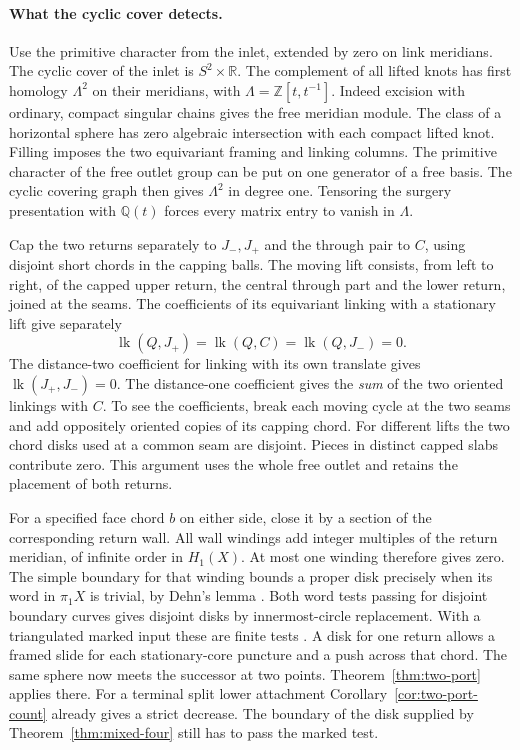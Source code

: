 \documentclass[11pt,letterpaper]{article}
\numberwithin{equation}{section}
\theoremstyle{remark}
\begin{document}
\paragraph{What the cyclic cover detects.}
Use the primitive character from the inlet, extended by zero on
link meridians. The cyclic cover of the inlet is \(S^2\times\mathbb R\).
The complement of all lifted knots has first homology
\(\Lambda^2\) on their meridians, with \(\Lambda=\mathbb Z[t,t^{-1}]\).
Indeed excision with ordinary, compact singular chains gives the
free meridian module. The class of a horizontal sphere has zero
algebraic intersection with each compact lifted knot. Filling imposes
the two equivariant framing and linking columns. The primitive
character of the free outlet group can be put on one generator of
a free basis. The cyclic covering graph then gives \(\Lambda^2\) in
degree one. Tensoring the surgery presentation with \(\mathbb Q(t)\)
forces every matrix entry to vanish in \(\Lambda\).

Cap the two returns separately to \(J_-,J_+\) and the through pair
to \(C\), using disjoint short chords in the capping balls. The
moving lift consists, from left to right, of the capped upper return,
the central through part and the lower return, joined at the seams.
The coefficients of its equivariant linking with a stationary lift
give separately
\[
 \operatorname{lk}(Q,J_+)=\operatorname{lk}(Q,C)
   =\operatorname{lk}(Q,J_-)=0.
\]
The distance-two coefficient for linking with its own translate
gives \(\operatorname{lk}(J_+,J_-)=0\). The distance-one coefficient
gives the \emph{sum} of the two oriented linkings with \(C\).
To see the coefficients, break each moving cycle at the two seams
and add oppositely oriented copies of its capping chord. For different
lifts the two chord disks used at a common seam are disjoint. Pieces
in distinct capped slabs contribute zero. This argument uses the
whole free outlet and retains the placement of both returns.

For a specified face chord \(b\) on either side, close it by a
section of the corresponding return wall. All wall windings add
integer multiples of the return meridian, of infinite order in
\(H_1(X)\). At most one winding therefore gives zero. The simple
boundary for that winding bounds a proper disk precisely when its
word in \(\pi_1 X\) is trivial, by Dehn's lemma
\cite{Papakyriakopoulos1957Dehn}. Both word tests passing for
disjoint boundary curves gives disjoint disks by innermost-circle
replacement. With a triangulated marked input these are finite
tests \cite{AschenbrennerFriedlWilton2015Decision}. A disk for
one return allows a framed slide for each stationary-core puncture
and a push across that chord. The same sphere now meets the successor
at two points. Theorem~\ref{thm:two-port} applies there. For a
terminal split lower attachment Corollary~\ref{cor:two-port-count}
already gives a strict decrease. The boundary of the disk supplied
by Theorem~\ref{thm:mixed-four} still has to pass the marked test.
\end{document}
